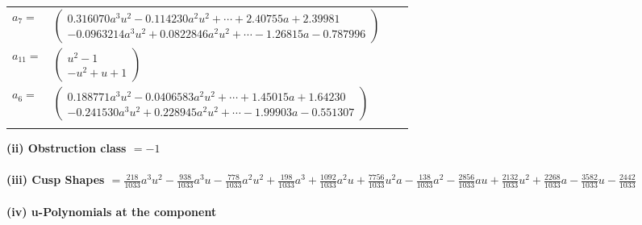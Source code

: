 \documentclass[1p]{elsarticle_modified}
\theoremstyle{definition}
\begin{document}
\begin{tabular}{m{7pt} m{180pt} m{7pt} m{180pt} }
\flushright $a_{7}=$&$\begin{pmatrix}0.316070 a^{3} u^{2}-0.114230 a^{2} u^{2}+\cdots+2.40755 a+2.39981\\-0.0963214 a^{3} u^{2}+0.0822846 a^{2} u^{2}+\cdots-1.26815 a-0.787996\end{pmatrix}$ \\
\flushright $a_{11}=$&$\begin{pmatrix}u^2-1\\- u^2+u+1\end{pmatrix}$ \\
\flushright $a_{6}=$&$\begin{pmatrix}0.188771 a^{3} u^{2}-0.0406583 a^{2} u^{2}+\cdots+1.45015 a+1.64230\\-0.241530 a^{3} u^{2}+0.228945 a^{2} u^{2}+\cdots-1.99903 a-0.551307\end{pmatrix}$\\&\end{tabular}
\flushleft \textbf{(ii) Obstruction class $= -1$}\\~\\
\flushleft \textbf{(iii) Cusp Shapes $= \frac{218}{1033} a^3 u^2-\frac{938}{1033} a^3 u-\frac{778}{1033} a^2 u^2+\frac{198}{1033} a^3+\frac{1092}{1033} a^2 u+\frac{7756}{1033} u^2 a-\frac{138}{1033} a^2-\frac{2856}{1033} a u+\frac{2132}{1033} u^2+\frac{2268}{1033} a-\frac{3582}{1033} u-\frac{2442}{1033}$}\\~\\
\newpage\renewcommand{\arraystretch}{1}
\flushleft \textbf{(iv) u-Polynomials at the component}\newline \\
\end{document}
